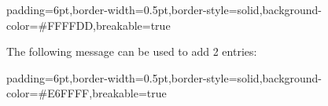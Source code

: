 \documentclass[11pt]{article}
\begin{document}
{%
\begin{mdbmargintb}{6pt}{6pt}%
\begin{mdblock}{padding=6pt,border-width=0.5pt,border-style=solid,background-color=\#FFFFDD,breakable=true}%
\begin{mdpre}%
\end{mdpre}%
\end{mdblock}%
\end{mdbmargintb}%

\noindent{}The following  message can be used to add 2 entries:%

\begin{mdbmargintb}{6pt}{6pt}%
\begin{mdblock}{padding=6pt,border-width=0.5pt,border-style=solid,background-color=\#E6FFFF,breakable=true}%
\begin{mdpre}%
\end{mdpre}%
\end{mdblock}%
\end{mdbmargintb}%

}
\end{document}
